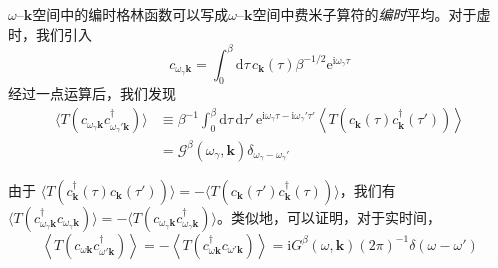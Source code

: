 $\omega$--$\pmb{k}$空间中的编时格林函数可以写成$\omega$--$\pmb{k}$空间中费米子算符的\emph{编时}平均。对于虚时，我们引入
\begin{equation*}
c_{\omega_{\gamma}\pmb{k}}=\int_{0}^{\beta}\mathrm{d}\tau\, c_{\pmb{k}}(\tau)\beta^{-1/2}\mathrm{e}^{\mathrm{i}\omega_{\gamma}\tau}
\end{equation*}
经过一点运算后，我们发现
\begin{align*}
\langle T(c_{\omega_{\gamma}\pmb{k}}c_{\omega_{\gamma}'\pmb{k}}^{\dagger})\rangle&\equiv\beta^{-1}\int_{0}^{\beta}\mathrm{d}\tau\,\mathrm{d}\tau'\,\mathrm{e}^{\mathrm{i}\omega_{\gamma}\tau-\mathrm{i}\omega_{\gamma}'\tau'}\left\langle T\left(c_{\pmb{k}}(\tau)c_{\pmb{k}}^{\dagger}(\tau')\right)\right\rangle\\
&=\mathcal{G}^{\beta}(\omega_{\gamma},\pmb{k})\delta_{\omega_{\gamma}-\omega_{\gamma}'}\tag{4.2.10}
\end{align*}


由于 $\langle T(c_{\pmb{k}}^{\dagger}(\tau)c_{\pmb{k}}(\tau'))\rangle = -\langle T(c_{\pmb{k}}(\tau')c_{\pmb{k}}^{\dagger}(\tau))\rangle$，我们有 $\langle T(c_{\omega_{\gamma}\pmb{k}}^{\dagger}c_{\omega_{\gamma}\pmb{k}})\rangle = -\langle T(c_{\omega_{\gamma}\pmb{k}}c_{\omega_{\gamma}\pmb{k}}^{\dagger})\rangle$。类似地，可以证明，对于实时间，
\begin{equation*}
\left\langle T(c_{\omega\pmb{k}}c_{\omega'\pmb{k}}^{\dagger})\right\rangle
= -\left\langle T(c_{\omega\pmb{k}}^{\dagger}c_{\omega'\pmb{k}})\right\rangle
= \mathrm{i}G^{\beta}(\omega,\pmb{k})(2\pi)^{-1}\delta(\omega-\omega')
\end{equation*}

